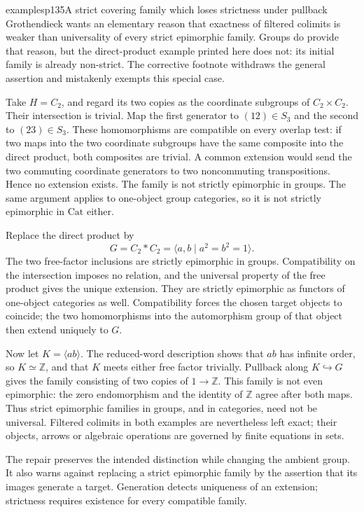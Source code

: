\begin{dcomment}{examples}{p135}{A strict covering family which loses strictness under pullback}
Grothendieck wants an elementary reason that exactness of filtered colimits is weaker than universality of every strict epimorphic family. Groups do provide that reason, but the direct-product example printed here does not: its initial family is already non-strict. The corrective footnote withdraws the general assertion and mistakenly exempts this special case.

Take $H=C_2$, and regard its two copies as the coordinate subgroups of $C_2\times C_2$. Their intersection is trivial. Map the first generator to $(12)\in S_3$ and the second to $(23)\in S_3$. These homomorphisms are compatible on every overlap test: if two maps into the two coordinate subgroups have the same composite into the direct product, both composites are trivial. A common extension would send the two commuting coordinate generators to two noncommuting transpositions. Hence no extension exists. The family is not strictly epimorphic in groups. The same argument applies to one-object group categories, so it is not strictly epimorphic in $\mathrm{Cat}$ either.

Replace the direct product by
\[
 G=C_2*C_2=\langle a,b\mid a^2=b^2=1\rangle.
\]
The two free-factor inclusions are strictly epimorphic in groups. Compatibility on the intersection imposes no relation, and the universal property of the free product gives the unique extension. They are strictly epimorphic as functors of one-object categories as well. Compatibility forces the chosen target objects to coincide; the two homomorphisms into the automorphism group of that object then extend uniquely to $G$.

Now let $K=\langle ab\rangle$. The reduced-word description shows that $ab$ has infinite order, so $K\simeq\mathbb Z$, and that $K$ meets either free factor trivially. Pullback along $K\hookrightarrow G$ gives the family consisting of two copies of $1\to\mathbb Z$. This family is not even epimorphic: the zero endomorphism and the identity of $\mathbb Z$ agree after both maps. Thus strict epimorphic families in groups, and in categories, need not be universal. Filtered colimits in both examples are nevertheless left exact; their objects, arrows or algebraic operations are governed by finite equations in sets.

The repair preserves the intended distinction while changing the ambient group. It also warns against replacing a strict epimorphic family by the assertion that its images generate a target. Generation detects uniqueness of an extension; strictness requires existence for every compatible family.
\end{dcomment}

